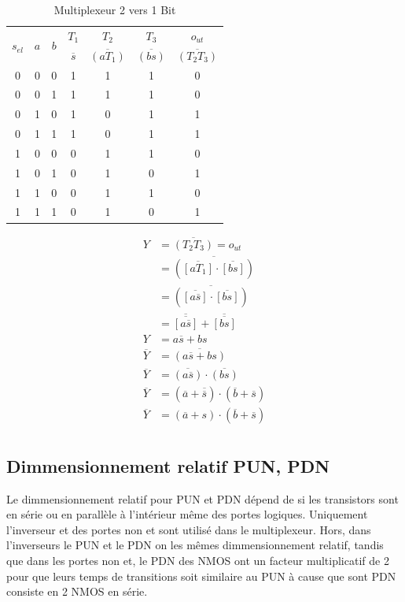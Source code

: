 \documentclass[a11paper]{article}
\newcommand{\quicktab}[4]{
  \begin{table}[H]
    \centering
    \caption{#1}
    \label{tab:#2}
    \begin{tabular}{#3}
      #4
    \end{tabular}
  \end{table}
}
\begin{document}
\begin{minipage}{0.48\textwidth}
\quicktab{Multiplexeur 2 vers 1 Bit}{mux2x1b}{ccccccc}{
  \toprule
  \multirow{2}{*}{$s_{el}$} &
  \multirow{2}{*}{$a$} &
  \multirow{2}{*}{$b$} &
  $T_1$ &
  $T_2$ &
  $T_3$ &
  $o_{ut}$ \\
  & & &
  $\overline{s}$ &
  $\overline{(aT_1)}$ &
  $\overline{(bs)}$ &
  $\overline{(T_2T_3)}$ \\
  \midrule
  0&0&0&1&1&1&0 \\
  0&0&1&1&1&1&0 \\
  0&1&0&1&0&1&1 \\
  0&1&1&1&0&1&1 \\
  1&0&0&0&1&1&0 \\
  1&0&1&0&1&0&1 \\
  1&1&0&0&1&1&0 \\
  1&1&1&0&1&0&1
  \\
  \bottomrule
}
\end{minipage}
\hfill
\begin{minipage}{0.48\textwidth}
\begin{align}
  Y &= \overline{(T_2T_3)} = o_{ut}  \\
  &= \overline{(\overline{[aT_1]}\cdot\overline{[bs]} )} \\
  &= \overline{(\overline{[a\overline{s}]}\cdot\overline{[bs]} )} \\
  &= \overline{\overline{[a\overline{s}]}} + \overline{\overline{[bs]}} \\
  Y &= a\overline{s} + bs \\
  \overline{Y} &= \overline{(a\overline{s} + bs)} \\
  \overline{Y} &= \overline{(a\overline{s})} \cdot \overline{(bs)} \\
  \overline{Y} &= (\overline{a}+\overline{\overline{s}}) \cdot (\overline{b}+\overline{s}) \\
  \overline{Y} &= (\overline{a}+s) \cdot (\overline{b}+\overline{s}) \\
\end{align}
\end{minipage}

\subsection{Dimmensionnement relatif PUN, PDN}

Le dimmensionnement relatif pour PUN et PDN dépend de si les transistors sont
en série ou en parallèle à l'intérieur même des portes logiques. Uniquement
l'inverseur et des portes non et sont utilisé dans le multiplexeur. Hors, dans
l'inverseurs le PUN et le PDN on les mêmes dimmensionnement relatif, tandis que
dans les portes non et, le PDN des NMOS ont un facteur multiplicatif de 2 pour
que leurs temps de transitions soit similaire au PUN à cause que sont PDN
consiste en 2 NMOS en série.
\end{document}
